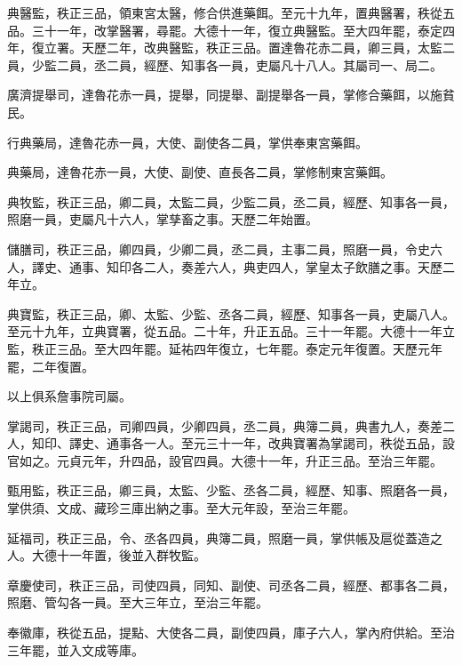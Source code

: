 \begin{pinyinscope}
 典醫監，秩正三品，領東宮太醫，修合供進藥餌。至元十九年，置典醫署，秩從五品。三十一年，改掌醫署，尋罷。大德十一年，復立典醫監。至大四年罷，泰定四年，復立署。天歷二年，改典醫監，秩正三品。置達魯花赤二員，卿三員，太監二員，少監二員，丞二員，經歷、知事各一員，吏屬凡十八人。其屬司一、局二。



 廣濟提舉司，達魯花赤一員，提舉，同提舉、副提舉各一員，掌修合藥餌，以施貧民。



 行典藥局，達魯花赤一員，大使、副使各二員，掌供奉東宮藥餌。



 典藥局，達魯花赤一員，大使、副使、直長各二員，掌修制東宮藥餌。



 典牧監，秩正三品，卿二員，太監二員，少監二員，丞二員，經歷、知事各一員，照磨一員，吏屬凡十六人，掌孳畜之事。天歷二年始置。



 儲膳司，秩正三品，卿四員，少卿二員，丞二員，主事二員，照磨一員，令史六人，譯史、通事、知印各二人，奏差六人，典吏四人，掌皇太子飲膳之事。天歷二年立。



 典寶監，秩正三品，卿、太監、少監、丞各二員，經歷、知事各一員，吏屬八人。至元十九年，立典寶署，從五品。二十年，升正五品。三十一年罷。大德十一年立監，秩正三品。至大四年罷。延祐四年復立，七年罷。泰定元年復置。天歷元年罷，二年復置。



 以上俱系詹事院司屬。



 掌謁司，秩正三品，司卿四員，少卿四員，丞二員，典簿二員，典書九人，奏差二人，知印、譯史、通事各一人。至元三十一年，改典寶署為掌謁司，秩從五品，設官如之。元貞元年，升四品，設官四員。大德十一年，升正三品。至治三年罷。



 甄用監，秩正三品，卿三員，太監、少監、丞各二員，經歷、知事、照磨各一員，掌供須、文成、藏珍三庫出納之事。至大元年設，至治三年罷。



 延福司，秩正三品，令、丞各四員，典簿二員，照磨一員，掌供帳及扈從蓋造之人。大德十一年置，後並入群牧監。



 章慶使司，秩正三品，司使四員，同知、副使、司丞各二員，經歷、都事各二員，照磨、管勾各一員。至大三年立，至治三年罷。



 奉徽庫，秩從五品，提點、大使各二員，副使四員，庫子六人，掌內府供給。至治三年罷，並入文成等庫。




\end{pinyinscope}
